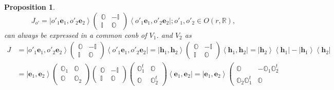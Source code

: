 \documentclass[aps,preprint]{revtex4}
\newtheorem{proposition}[theorem]{Proposition}
\begin{document}
\begin{proposition}
\begin{equation}
J_{o\prime }=\left\vert o\prime _{1}\mathbf{e}_{1},o\prime _{2}\mathbf{e}%
_{2}\right\rangle \left( 
\begin{array}{cc}
\mathbb{O} & -\mathbb{I} \\ 
\mathbb{I} & \mathbb{O}%
\end{array}%
\right) \left\langle o\prime _{1}\mathbf{e}_{1},o\prime _{2}\mathbf{e}%
_{2}\right\vert ;o\prime _{1},o\prime _{2}\in O\left( r,\mathbb{R}\right) ,
\end{equation}%
can always be expressed in a common conb of $V_{1}$. and $V_{2}$ as 
\begin{align}
J& =\left\vert o\prime _{1}\mathbf{e}_{1},o\prime _{2}\mathbf{e}%
_{2}\right\rangle \left( 
\begin{array}{cc}
\mathbb{O} & -\mathbb{I} \\ 
\mathbb{I} & \mathbb{O}%
\end{array}%
\right) \left\langle o\prime _{1}\mathbf{e}_{1},o\prime _{2}\mathbf{e}%
_{2}\right\vert =\left\vert \mathbf{h}_{1},\mathbf{h}_{2}\right\rangle
\left( 
\begin{array}{cc}
\mathbb{O} & -\mathbb{I} \\ 
\mathbb{I} & \mathbb{O}%
\end{array}%
\right) \left\langle \mathbf{h}_{1},\mathbf{h}_{2}\right\vert =\left\vert 
\mathbf{h}_{2}\right\rangle \left\langle \mathbf{h}_{1}\right\vert
-\left\vert \mathbf{h}_{1}\right\rangle \left\langle \mathbf{h}%
_{2}\right\vert \\
& =\left\vert \mathbf{e}_{1},\mathbf{e}_{2}\right\rangle \left( 
\begin{array}{cc}
\mathbb{O}_{1} & \mathbb{O} \\ 
\mathbb{O} & \mathbb{O}_{2}%
\end{array}%
\right) \left( 
\begin{array}{cc}
\mathbb{O} & -\mathbb{I} \\ 
\mathbb{I} & \mathbb{O}%
\end{array}%
\right) \left( 
\begin{array}{cc}
\mathbb{O}_{1}^{t} & \mathbb{O} \\ 
\mathbb{O} & \mathbb{O}_{2}^{t}%
\end{array}%
\right) \left\langle \mathbf{e}_{1},\mathbf{e}_{2}\right\vert =\left\vert 
\mathbf{e}_{1},\mathbf{e}_{2}\right\rangle \left( 
\begin{array}{cc}
\mathbb{O} & -\mathbb{O}_{1}\mathbb{O}_{2}^{t} \\ 
\mathbb{O}_{2}\mathbb{O}_{1}^{t} & \mathbb{O}%

\end{array}
\end{align}
\end{proposition}
\end{document}
